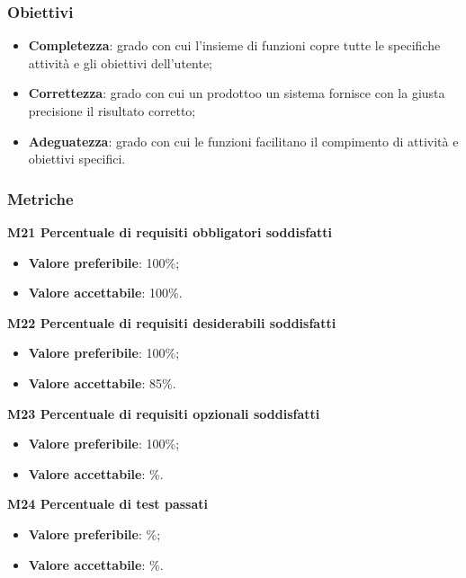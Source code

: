         \subsubsection{Obiettivi}
            \begin{itemize}
                \item \textbf{Completezza}: grado con cui l'insieme di funzioni copre tutte le specifiche attività e gli obiettivi dell'utente;
                \item \textbf{Correttezza}: grado con cui un prodotto\glosp o un sistema fornisce con la giusta precisione il risultato corretto;
                \item \textbf{Adeguatezza}: grado con cui le funzioni facilitano il compimento di attività e obiettivi specifici.
            \end{itemize}
        \subsubsection{Metriche}
            \textbf{M21 Percentuale di requisiti obbligatori soddisfatti}
                \begin{itemize}
                    \item \textbf{Valore preferibile}: 100\%;
                    \item \textbf{Valore accettabile}: 100\%.
                \end{itemize}
            \textbf{M22 Percentuale di requisiti desiderabili soddisfatti}
            \begin{itemize}
            	\item \textbf{Valore preferibile}: 100\%;
            	\item \textbf{Valore accettabile}: 85\%.
            \end{itemize}
        	\textbf{M23 Percentuale di requisiti opzionali soddisfatti}
        	\begin{itemize}
        		\item \textbf{Valore preferibile}: 100\%;
        		\item \textbf{Valore accettabile}: \%.
        	\end{itemize}
        	\textbf{M24 Percentuale di test passati}
        	\begin{itemize}
        		\item \textbf{Valore preferibile}: \%;
        		\item \textbf{Valore accettabile}: \%.
        	\end{itemize}
